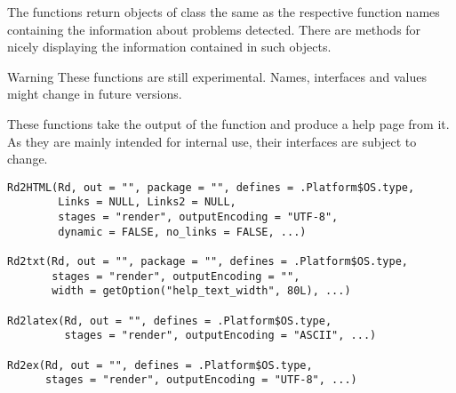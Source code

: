 %
\begin{Value}
The functions return objects of class the same as the respective
function names containing the information about problems detected.
There are  methods for nicely displaying the information
contained in such objects.
\end{Value}
%
\begin{Section}{Warning}
These functions are still experimental.  Names, interfaces and values
might change in future versions.
\end{Section}
%
\begin{Description}\relax
These functions take the output of the  function
and produce a help page from it.  As they are mainly
intended for internal use, their interfaces are subject to change.
\end{Description}
%
\begin{Usage}
\begin{verbatim}
Rd2HTML(Rd, out = "", package = "", defines = .Platform$OS.type,
        Links = NULL, Links2 = NULL,
        stages = "render", outputEncoding = "UTF-8", 
        dynamic = FALSE, no_links = FALSE, ...)

Rd2txt(Rd, out = "", package = "", defines = .Platform$OS.type,
       stages = "render", outputEncoding = "",
       width = getOption("help_text_width", 80L), ...)

Rd2latex(Rd, out = "", defines = .Platform$OS.type,
         stages = "render", outputEncoding = "ASCII", ...)

Rd2ex(Rd, out = "", defines = .Platform$OS.type,
      stages = "render", outputEncoding = "UTF-8", ...)
\end{verbatim}
\end{Usage}
%
